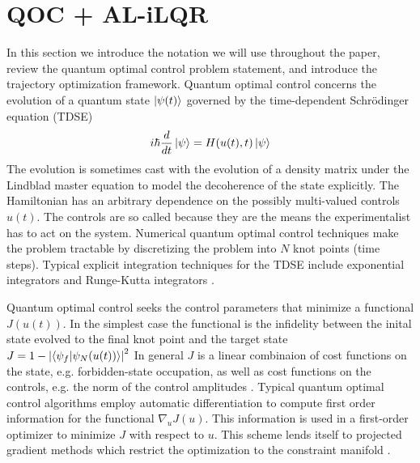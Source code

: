 \section{QOC + AL-iLQR}
In this section we introduce the notation
we will use throughout the paper,
review the quantum optimal control problem statement,
and introduce the trajectory optimization framework.
Quantum optimal control concerns the evolution of
a quantum state $\ket{\psi(t)}$ governed by the time-dependent
Schr{\"o}dinger equation (TDSE)
\begin{equation}
  i \hbar \frac{d}{dt} \ket{\psi} = H(u(t), t) \ket{\psi}
  \label{eq:tdse}
\end{equation}
The evolution is sometimes cast with the evolution
of a density matrix under the Lindblad master equation to
model the decoherence of the state explicitly. The Hamiltonian
has an arbitrary dependence on the possibly multi-valued controls $u(t)$.
The controls are so called because they are the means the experimentalist has to
act on the system. Numerical quantum optimal control techniques make
the problem tractable by discretizing the problem into $N$
knot points (time steps). Typical explicit integration techniques for the TDSE include
exponential integrators \cite{auer2018magnus, berland2005solving, einkemmer2017performance}
and Runge-Kutta integrators \cite{jorgensen2011numerical}.

Quantum optimal control seeks the control
parameters that minimize a functional $J(u(t))$.
In the simplest case the functional is
the infidelity between the inital state evolved
to the final knot point and the target state
$J = 1 - {\lvert \braket{\psi_{f} \lvert \psi_{N}(u(t))} \rvert}^{2}$
In general $J$ is a linear combinaion of cost functions on the state, e.g.
forbidden-state occupation, as well as
cost functions on the controls, e.g. the norm of the control amplitudes
\cite{leung2017speedup}. Typical quantum optimal control
algorithms employ automatic differentiation
to compute first order information for the functional $\nabla_{u} J(u)$.
This information is used in a first-order optimizer to minimize $J$ with respect to $u$.
This scheme lends itself to projected gradient methods
which restrict the optimization to the constraint manifold
\cite{clarkson2010coresets, hauswirth2016projected}.

